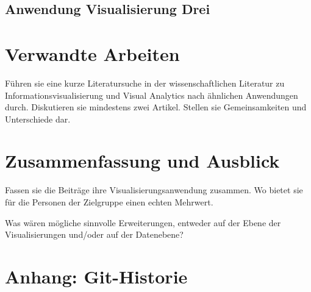\documentclass[usegeometry=true]{scrartcl}
\begin{document}
\subsection{Anwendung Visualisierung Drei}

\section{Verwandte Arbeiten}
Führen sie eine kurze Literatursuche in der wissenschaftlichen Literatur zu Informationsvisualisierung und Visual Analytics nach ähnlichen Anwendungen durch. Diskutieren sie mindestens zwei Artikel. Stellen sie Gemeinsamkeiten und Unterschiede dar.

\section{Zusammenfassung und Ausblick}
Fassen sie die Beiträge ihre Visualisierungsanwendung zusammen. Wo bietet sie für die Personen der Zielgruppe einen echten Mehrwert.

Was wären mögliche sinnvolle Erweiterungen, entweder auf der Ebene der Visualisierungen und/oder auf der Datenebene?

\section*{Anhang: Git-Historie}
\newpage

\end{document}
